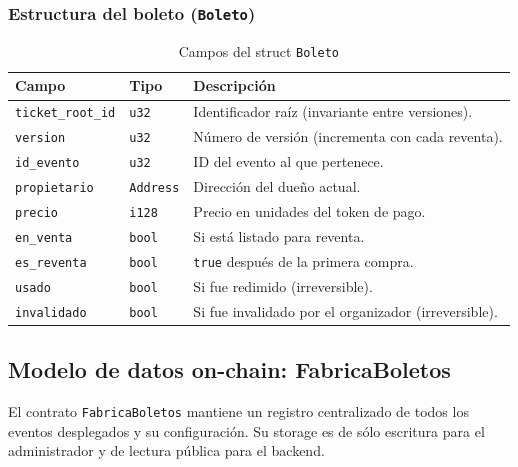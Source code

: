 \documentclass[12pt,oneside]{article}
\begin{document}
\subsubsection{Estructura del boleto (\texttt{Boleto})}

\begin{table}[htbp]
\centering
\caption{Campos del struct \texttt{Boleto}}
\begin{tabularx}{\textwidth}{l l X}
\toprule
\textbf{Campo} & \textbf{Tipo} & \textbf{Descripción} \\
\midrule
\texttt{ticket\_root\_id} & \texttt{u32} & Identificador raíz (invariante entre versiones). \\
\texttt{version} & \texttt{u32} & Número de versión (incrementa con cada reventa). \\
\texttt{id\_evento} & \texttt{u32} & ID del evento al que pertenece. \\
\texttt{propietario} & \texttt{Address} & Dirección del dueño actual. \\
\texttt{precio} & \texttt{i128} & Precio en unidades del token de pago. \\
\texttt{en\_venta} & \texttt{bool} & Si está listado para reventa. \\
\texttt{es\_reventa} & \texttt{bool} & \texttt{true} después de la primera compra. \\
\texttt{usado} & \texttt{bool} & Si fue redimido (irreversible). \\
\texttt{invalidado} & \texttt{bool} & Si fue invalidado por el organizador (irreversible). \\
\bottomrule
\end{tabularx}
\end{table}

\FloatBarrier
\subsection{Modelo de datos on-chain: FabricaBoletos}

El contrato \texttt{FabricaBoletos} mantiene un registro centralizado de todos los eventos desplegados y su configuración. Su storage es de sólo escritura para el administrador y de lectura pública para el backend.
\end{document}
